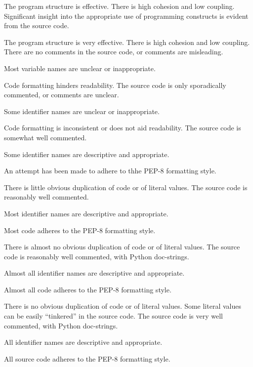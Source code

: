 \documentclass{fal_assignment}
\begin{document}
\begin{markingrubric}
            \par The program structure is effective. There is high cohesion and low coupling.
        \grade Significant insight into the appropriate use of programming constructs is evident from the source code.
            \par The program structure is very effective. There is high cohesion and low coupling.
%
        \grade\fail There are no comments in the source code, or comments are misleading.
            \par Most variable names are unclear or inappropriate.
            \par Code formatting hinders readability.
        \grade The source code is only sporadically commented, or comments are unclear.
            \par Some identifier names are unclear or inappropriate.
            \par Code formatting is inconsistent or does not aid readability.
        \grade The source code is somewhat well commented.
            \par Some identifier names are descriptive and appropriate.
            \par An attempt has been made to adhere to thhe PEP-8 formatting style.
             \par There is little obvious duplication of code or of literal values.           
        \grade The source code is reasonably well commented.
            \par Most identifier names are descriptive and appropriate.
            \par Most code adheres to the PEP-8 formatting style.
             \par There is almost no obvious duplication of code or of literal values.   
        \grade The source code is reasonably well commented, with Python doc-strings.
            \par Almost all identifier names are descriptive and appropriate.
            \par Almost all code adheres to the PEP-8 formatting style.
             \par There is no obvious duplication of code or of literal values. Some literal values can be easily ``tinkered'' in the source code. 
        \grade The source code is very well commented, with Python doc-strings.
            \par All identifier names are descriptive and appropriate.
            \par All source code adheres to the PEP-8 formatting style.

\end{markingrubric}
\end{document}
